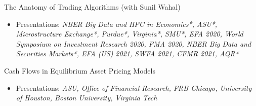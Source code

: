 \documentclass[11pt]{article}
\newenvironment{innerlist}[1][\enskip\textbullet]%
        {\begin{itemize}[#1,leftmargin=*,parsep=0pt,itemsep=0pt,topsep=0pt,partopsep=0pt]}
        {\end{itemize}}
\newcommand{\blankline}{\quad\pagebreak[3]}
\newcommand{\halfblankline}{\quad\vspace{-0.5\baselineskip}\pagebreak[3]}
\begin{document}
\halfblankline




The Anatomy of Trading Algorithms (with Sunil Wahal) 
\begin{innerlist}
        \item[] \begin{footnotesize}
                Presentations: \textit{NBER Big Data and HPC in Economics*, ASU*, Microstructure Exchange*, Purdue*, Virginia*, SMU*, EFA 2020, World Symposium on Investment Research 2020, FMA 2020, NBER Big Data and Securities Markets*, EFA (US) 2021, SWFA 2021, CFMR 2021, AQR*}
        \end{footnotesize}
\end{innerlist}

\blankline

Cash Flows in Equilibrium Asset Pricing Models
\begin{innerlist}
        \item[] \begin{footnotesize}
                Presentations: \textit{ASU, Office of Financial Research, FRB Chicago, University of Houston, Boston University, Virginia Tech}
        \end{footnotesize}
\end{innerlist}
\end{document}
